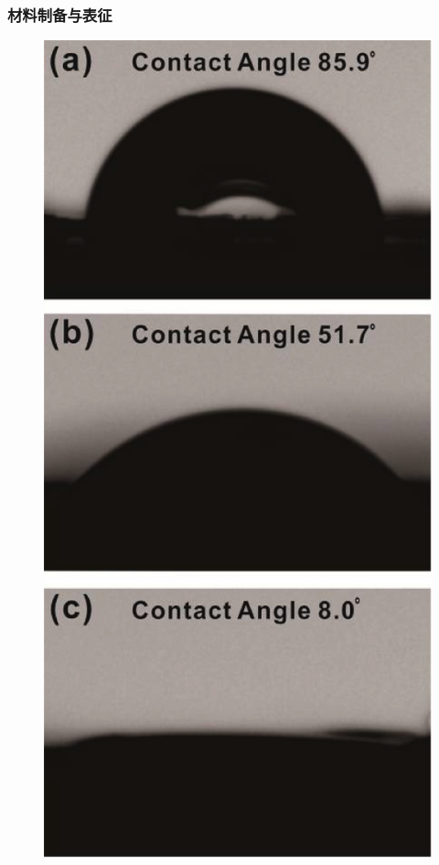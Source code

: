 \documentclass{beamer}
\begin{document}
\begin{frame}
  \frametitle{材料制备与表征}
  \begin{minipage}{0.48\textwidth}
    \begin{figure}[h]
      \centering
      \includegraphics[width=0.55\linewidth]{figures/Maleimide-CA.png}
    \end{figure}
  \end{minipage}
  \hfill
  \begin{minipage}{0.48\textwidth}
    \begin{figure}[h]
      \centering

\end{figure}
\end{minipage}
\end{frame}
\end{document}
